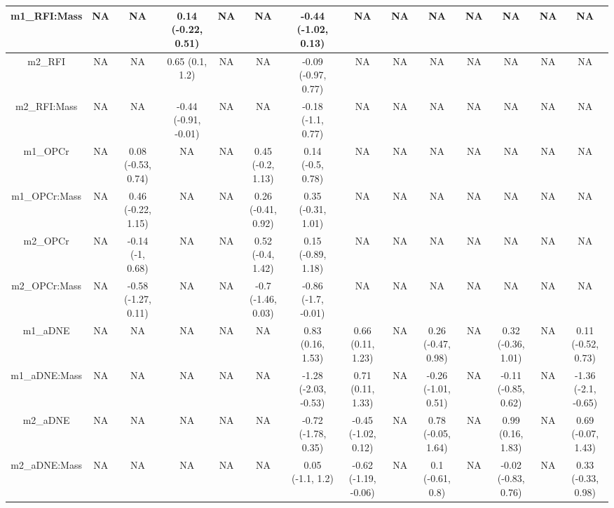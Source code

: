 \begin{table}
\begin{tabular}[t]{c|c|c|c|c|c|c|c|c|c|c|c|c|c}
\hline
m1_RFI:Mass & NA & NA & 0.14 (-0.22, 0.51) & NA & NA & -0.44 (-1.02, 0.13) & NA & NA & NA & NA & NA & NA & NA\\
\hline
m2_RFI & NA & NA & 0.65 (0.1, 1.2) & NA & NA & -0.09 (-0.97, 0.77) & NA & NA & NA & NA & NA & NA & NA\\
\hline
m2_RFI:Mass & NA & NA & -0.44 (-0.91, -0.01) & NA & NA & -0.18 (-1.1, 0.77) & NA & NA & NA & NA & NA & NA & NA\\
\hline
m1_OPCr & NA & 0.08 (-0.53, 0.74) & NA & NA & 0.45 (-0.2, 1.13) & 0.14 (-0.5, 0.78) & NA & NA & NA & NA & NA & NA & NA\\
\hline
m1_OPCr:Mass & NA & 0.46 (-0.22, 1.15) & NA & NA & 0.26 (-0.41, 0.92) & 0.35 (-0.31, 1.01) & NA & NA & NA & NA & NA & NA & NA\\
\hline
m2_OPCr & NA & -0.14 (-1, 0.68) & NA & NA & 0.52 (-0.4, 1.42) & 0.15 (-0.89, 1.18) & NA & NA & NA & NA & NA & NA & NA\\
\hline
m2_OPCr:Mass & NA & -0.58 (-1.27, 0.11) & NA & NA & -0.7 (-1.46, 0.03) & -0.86 (-1.7, -0.01) & NA & NA & NA & NA & NA & NA & NA\\
\hline
m1_aDNE & NA & NA & NA & NA & NA & 0.83 (0.16, 1.53) & 0.66 (0.11, 1.23) & NA & 0.26 (-0.47, 0.98) & NA & 0.32 (-0.36, 1.01) & NA & 0.11 (-0.52, 0.73)\\
\hline
m1_aDNE:Mass & NA & NA & NA & NA & NA & -1.28 (-2.03, -0.53) & 0.71 (0.11, 1.33) & NA & -0.26 (-1.01, 0.51) & NA & -0.11 (-0.85, 0.62) & NA & -1.36 (-2.1, -0.65)\\
\hline
m2_aDNE & NA & NA & NA & NA & NA & -0.72 (-1.78, 0.35) & -0.45 (-1.02, 0.12) & NA & 0.78 (-0.05, 1.64) & NA & 0.99 (0.16, 1.83) & NA & 0.69 (-0.07, 1.43)\\
\hline
m2_aDNE:Mass & NA & NA & NA & NA & NA & 0.05 (-1.1, 1.2) & -0.62 (-1.19, -0.06) & NA & 0.1 (-0.61, 0.8) & NA & -0.02 (-0.83, 0.76) & NA & 0.33 (-0.33, 0.98)\\
\hline
\end{tabular}
\endgroup{}
\end{table}
